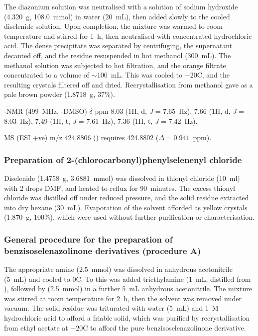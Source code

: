\begin{refsection}
The diazonium solution was neutralised with a solution of sodium hydroxide (4.320~g, 108.0~mmol) in water (20~mL), then added slowly to the cooled diselenide solution.
Upon completion, the mixture was warmed to room temperature and stirred for 1~h, then neutralised with concentrated hydrochloric acid.
The dense precipitate was separated by centrifuging, the supernatant decanted off, and the residue resuspended in hot methanol (300~mL).
The methanol solution was subjected to hot filtration, and the orange filtrate concentrated to a volume of $\sim$100~mL.
This was cooled to $-20$\degree{}C, and the resulting crystals filtered off and dried.
Recrystallisation from methanol gave  as a pale brown powder (1.8718~g, 37\%).

-NMR (499~MHz, -DMSO) $\delta$ ppm 8.03 (1H, d, \textit{J} = 7.65~Hz), 7.66 (1H, d, \textit{J} = 8.03~Hz), 7.49 (1H, t, \textit{J} = 7.61~Hz), 7.36 (1H, t, \textit{J} = 7.42~Hz).

MS (ESI +ve) m/z 424.8806 ()  requires 424.8802 ($ \Delta =0.941$~ppm).

\subsubsection[Preparation of \refcmpd{dichloride}]{Preparation of 2-(chlorocarbonyl)phenylselenenyl chloride }
Diselenide  (1.4758~g, 3.6881~mmol) was dissolved in thionyl chloride (10~ml) with 2 drops DMF, and heated to reflux for 90~minutes.
The excess thionyl chloride was distilled off under reduced pressure, and the solid residue extracted into dry hexane (30~mL).
Evaporation of the solvent afforded  as yellow crystals (1.870~g, 100\%), which were used without further purification or characterisation.

\subsubsection[General procedure A]{General procedure for the preparation of benzisoselenazolinone derivatives  (procedure A)}
The appropriate amine (2.5~mmol) was dissolved in anhydrous acetonitrile (5~mL) and cooled to 0\degree{}C.
To this was added triethylamine (1~mL, distilled from ), followed by  (2.5~mmol) in a further 5~mL anhydrous acetonitrile.
The mixture was stirred at room temperature for 2~h, then the solvent was removed under vacuum.
The solid residue was triturated with water (5~mL) and 1~M hydrochloric acid to afford a friable solid, which was purified by recrystallisation from ethyl acetate at $-20$\degree{}C to afford the pure benzisoselenazolinone derivative.


\end{refsection}
